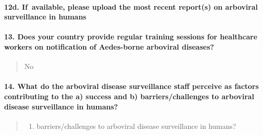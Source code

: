 \documentclass[
]{article}
\providecommand{\tightlist}{%
  \setlength{\itemsep}{0pt}\setlength{\parskip}{0pt}}
\begin{document}
\hypertarget{d.-if-available-please-upload-the-most-recent-reports-on-arboviral-surveillance-in-humans}{%
\paragraph{12d. If~available, please upload the most recent report(s) on
arboviral surveillance in
humans}\label{d.-if-available-please-upload-the-most-recent-reports-on-arboviral-surveillance-in-humans}}

\begin{quote}
\end{quote}

\hypertarget{does-your-country-provide-regular-training-sessions-for-healthcare-workers-on-notification-of-aedes-borne-arboviral-diseases}{%
\paragraph{13. Does your country provide regular training sessions for
healthcare workers on notification of Aedes-borne arboviral
diseases?}\label{does-your-country-provide-regular-training-sessions-for-healthcare-workers-on-notification-of-aedes-borne-arboviral-diseases}}

\begin{quote}
No
\end{quote}

\hypertarget{what-do-the-arboviral-disease-surveillance-staff-perceive-as-factors-contributing-to-the-a-success-and-b-barrierschallenges-to-arboviral-disease-surveillance-in-humans}{%
\paragraph{14. What do the arboviral disease surveillance staff perceive
as factors contributing to the a) success and b) barriers/challenges to
arboviral disease surveillance in
humans?}\label{what-do-the-arboviral-disease-surveillance-staff-perceive-as-factors-contributing-to-the-a-success-and-b-barrierschallenges-to-arboviral-disease-surveillance-in-humans}}

\begin{quote}
\begin{enumerate}
\def\labelenumi{\alph{enumi})}
\setcounter{enumi}{1}
\tightlist
\item
  barriers/challenges to arboviral disease surveillance in humans?
\end{enumerate}
\end{quote}
\end{document}
